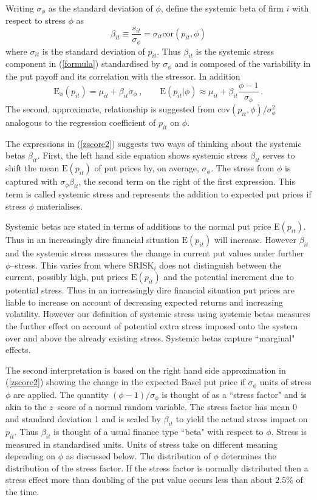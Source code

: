 \documentclass[12pt]{article}
\newcommand{\E}{\mathrm{E}}
\newcommand{\cov}{\mathrm{cov}}
\newcommand{\Es}{\E_\phi}
\newcommand{\cor}{\mathrm{cor}}
\newcommand{\eref}[1]{(\ref{#1})}
\newcommand{\cq}{\ , \qquad}
\newcommand{\be}[1]{\begin{equation}\label{#1}}
\newcommand{\ee}{\end{equation}}
\begin{document}
Writing  $\sigma_{\phi}$ as the standard deviation of $\phi$,  define the systemic beta of firm $i$ with respect to stress $\phi$ as
\be{zscore}
\beta_{it}\equiv \frac{s_{it}}{\sigma_\phi} = \sigma_{it}\cor(p_{it},\phi)
\ee
where $\sigma_{it}$ is the standard deviation of $p_{it}$.   Thus $\beta_{it}$ is the systemic stress component in \eref{formula} standardised by $\sigma_\phi$ and is composed of the variability in the put payoff and its correlation with the stressor. In addition
\be{zscore2}
\Es(p_{it})  = \mu_{it} + \beta_{it}\sigma_\phi\cq \E(p_{it}|\phi) \approx \mu_{it} + \beta_{it}\frac{\phi-1}{\sigma_\phi}\ .
\ee
The second, approximate, relationship is suggested from   $\cov(p_{it},\phi)/\sigma^2_\phi$ analogous to the regression coefficient of $p_{it}$ on $\phi$.

The expressions in \eref{zscore2} suggests two ways of  thinking about the  systemic betas  $\beta_{it}$.   First, the left hand side equation shows systemic stress $\beta_{it}$ serves to shift the mean $\E(p_{it})$ of put prices  by, on average, $\sigma_\phi$.    The stress from $\phi$ is captured with $\sigma_\phi\beta_{it}$, the second term on the right of the first expression.   This term is called systemic stress and represents the addition to expected put prices if stress $\phi$ materialises.

Systemic betas are stated in terms of additions to the normal put price $\E(p_{it})$. Thus in an increasingly dire financial situation $\E(p_{it})$ will increase.   However  $\beta_{it}$ and the systemic stress measures the  change in current put values  under  further $\phi$--stress.  This varies from  \cite{brownlees2015} where $\mathrm{SRISK}_i$ does not distinguish between the current, possibly high, put prices $\E(p_{it})$ and the potential  increment due to potential stress.   Thus in an increasingly dire financial situation put prices are liable to increase on account of decreasing expected returns and increasing volatility.   However our definition of systemic stress using systemic betas measures the further effect on account of potential extra stress imposed onto the system over and above the already existing stress.   Systemic betas capture   ``marginal" effects.

The second interpretation is based on  the right hand side approximation in \eref{zscore2} showing   the change in the  expected Basel put price if  $\sigma_\phi$ units of stress $\phi$ are applied.  The quantity $(\phi-1)/\sigma_\phi$ is thought of as a ``stress factor" and is akin to the $z$--score of a normal random variable.  The stress factor has mean 0 and standard deviation 1 and is scaled by $\beta_{it}$ to yield the actual stress impact on  $p_{it}$.  Thus  $\beta_{it}$ is thought of a usual finance type ``beta" with respect to $\phi$.   Stress is measured in standardised units.  Units of stress take on different meaning depending on  $\phi$ as discussed below. The distribution of $\phi$ determines the distribution of the stress factor. If the stress factor is normally distributed then a stress effect more than doubling of the put value  occurs less than about $2.5\%$ of the time.
\end{document}
